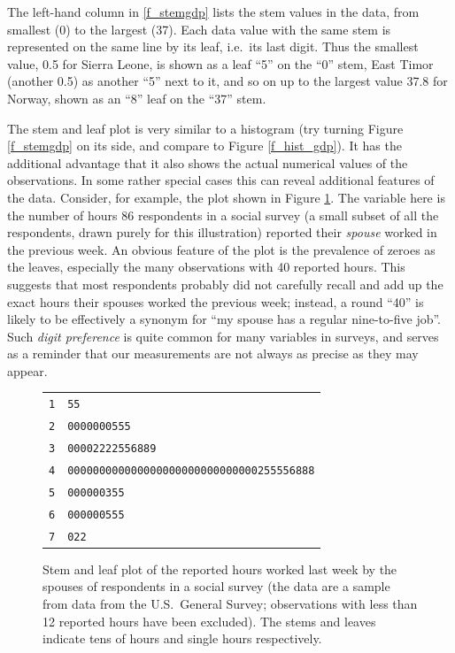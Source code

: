 The left-hand column in \ref{f_stemgdp} lists the stem values in the
data, from smallest (0) to the largest (37). Each data value with the
same stem is represented on the same line by its leaf, i.e.\ its last
digit. Thus the smallest value, 0.5 for Sierra Leone, is shown as a
leaf ``5'' on the ``0'' stem, East Timor (another 0.5) as another ``5''
next to it, and so on up to the largest value 37.8 for Norway, shown as
an ``8'' leaf on the ``37'' stem.

The stem and leaf plot is very similar to a histogram (try turning
Figure \ref{f_stemgdp} on its side, and compare to Figure
\ref{f_hist_gdp}). It has the additional advantage that it also shows
the actual numerical values of the observations. In some rather special
cases this can reveal additional features of the data.
Consider, for example, the plot shown in Figure \ref{f_stemhours}. The
variable here is the number of hours 86 respondents in a social survey
(a small subset of all the respondents, drawn purely for
this illustration) reported their \emph{spouse} worked in the previous
week. An obvious feature of the plot is the prevalence of zeroes as the
leaves, especially the many observations with 40 reported hours. This
suggests that most respondents probably did not carefully recall and add
up the exact hours their spouses worked the previous week; instead, a
round ``40'' is likely to be effectively a synonym for ``my
spouse has a regular nine-to-five job''. Such \emph{digit preference} is
quite common for many variables in surveys, and serves as a
reminder that our measurements are not always as precise as they may
appear.

\begin{figure}
\caption{Stem and leaf plot of the reported hours worked last week
by the spouses of respondents in a social survey (the data are a sample
from data from the U.S.\ General Survey; observations
with less than 12 reported hours have been excluded).
The stems and leaves indicate tens of hours and single hours
respectively.}
\label{f_stemhours}
\begin{center}
\begin{tabular}{l|l}
\texttt{1} &  \texttt{55}\\
\texttt{2} &  \texttt{0000000555}\\
\texttt{3} &  \texttt{00002222556889}\\
\texttt{4} &  \texttt{000000000000000000000000000000255556888}\\
\texttt{5} &  \texttt{000000355}\\
\texttt{6} &  \texttt{000000555}\\
\texttt{7} &  \texttt{022}\\
\end{tabular}
\end{center}
\end{figure}

